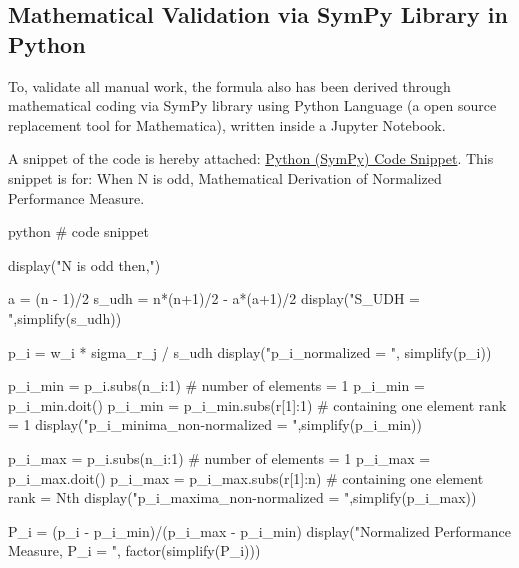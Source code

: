 \documentclass[man,floatsintext]{apa7}
\begin{document}
\subsection{Mathematical Validation via SymPy Library in Python}
To, validate all manual work, the formula also has been derived through mathematical coding via SymPy library using Python Language (a open source replacement tool for Mathematica), written inside a Jupyter Notebook.

A snippet of the code is hereby attached: \hyperref[code:snippet_odd_performance_measure]{Python (SymPy) Code Snippet}. This snippet is for: When N is odd, Mathematical Derivation of Normalized Performance Measure.

 	\label{code:snippet_odd_performance_measure}
\begin{mintedbox}{python}
	# code snippet
	
	display("N is odd then,")
	
	a = (n - 1)/2
	s_udh = n*(n+1)/2 - a*(a+1)/2
	display("S_UDH = ",simplify(s_udh))
	
	p_i = w_i * sigma_r_j / s_udh
	display("p_i_normalized = ", simplify(p_i))
	
	p_i_min = p_i.subs({n_i:1}) # number of elements = 1
	p_i_min = p_i_min.doit()
	p_i_min = p_i_min.subs({r[1]:1}) # containing one element rank = 1
	display("p_i_minima_non-normalized = ",simplify(p_i_min))
	
	p_i_max = p_i.subs({n_i:1}) # number of elements = 1
	p_i_max = p_i_max.doit()
	p_i_max = p_i_max.subs({r[1]:n}) # containing one element rank = Nth
	display("p_i_maxima_non-normalized = ",simplify(p_i_max))
	
	P_i = (p_i - p_i_min)/(p_i_max - p_i_min)
	display("Normalized Performance Measure, P_i = ", factor(simplify(P_i)))
\end{mintedbox}
\end{document}
